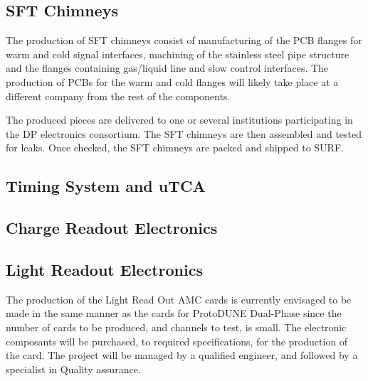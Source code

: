\subsection{SFT Chimneys}
\label{sec:fddp-tpc-elec-prod-sft}
The production of SFT chimneys consist of manufacturing of the PCB flanges for warm and cold signal interfaces, machining of the stainless steel pipe structure and the flanges containing gas/liquid line and slow control interfaces. The production of PCBs for the warm and cold flanges will likely take place at a different company from the rest of the components. 

The produced pieces are delivered to one or several institutions participating in the DP electronics consortium. The SFT chimneys are then assembled and tested for leaks. 
Once checked, the SFT chimneys are packed and shipped to SURF. 

\subsection{Timing System and uTCA}
\label{sec:fddp-tpc-elec-prod-utca}



\subsection{Charge Readout Electronics}
\label{sec:fddp-tpc-elec-prod-cro}

\subsection{Light Readout Electronics}
\label{sec:fddp-tpc-elec-prod-lro}

The production of the Light Read Out AMC cards is currently envisaged to be made in the same manner as the cards for ProtoDUNE Dual-Phase since the number of cards to be produced, and channels to test, is small. The electronic composants will be purchased, to required specifications, for the production of the card. The project will be managed by a qualified engineer, and followed by a specialist in Quality assurance.

